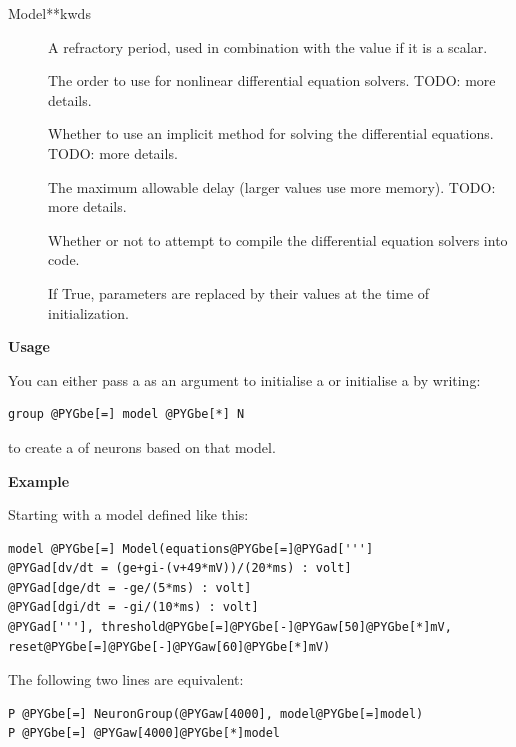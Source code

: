 \documentclass[letterpaper,10pt,english]{manual}
\begin{document}
\begin{classdesc}{Model}{**kwds}
\begin{description}
\item[]
A refractory period, used in combination with the  value
if it is a scalar.

\item[]
The order to use for nonlinear differential equation solvers.
TODO: more details.

\item[]
Whether to use an implicit method for solving the differential
equations. TODO: more details.

\item[]
The maximum allowable delay (larger values use more memory).
TODO: more details.

\item[]
Whether or not to attempt to compile the differential equation
solvers into  code.

\item[]
If True, parameters are replaced by their values at the time
of initialization.

\end{description}

\textbf{Usage}

You can either pass a \hyperlink{brian.Model}{} as an argument to initialise a
\hyperlink{brian.NeuronGroup}{} or initialise a \hyperlink{brian.NeuronGroup}{} by writing:

\begin{Verbatim}[commandchars=@\[\]]
group @PYGbe[=] model @PYGbe[*] N
\end{Verbatim}

to create a \hyperlink{brian.NeuronGroup}{} of  neurons based on that model.

\textbf{Example}

Starting with a model defined like this:

\begin{Verbatim}[commandchars=@\[\]]
model @PYGbe[=] Model(equations@PYGbe[=]@PYGad[''']
@PYGad[dv/dt = (ge+gi-(v+49*mV))/(20*ms) : volt]
@PYGad[dge/dt = -ge/(5*ms) : volt]
@PYGad[dgi/dt = -gi/(10*ms) : volt]
@PYGad['''], threshold@PYGbe[=]@PYGbe[-]@PYGaw[50]@PYGbe[*]mV, reset@PYGbe[=]@PYGbe[-]@PYGaw[60]@PYGbe[*]mV)
\end{Verbatim}

The following two lines are equivalent:

\begin{Verbatim}[commandchars=@\[\]]
P @PYGbe[=] NeuronGroup(@PYGaw[4000], model@PYGbe[=]model)
P @PYGbe[=] @PYGaw[4000]@PYGbe[*]model
\end{Verbatim}
\end{classdesc}
\end{document}
